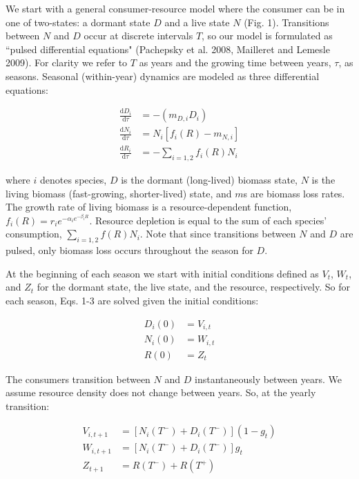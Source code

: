 \documentclass[12pt,]{article}
\begin{document}
We start with a general consumer-resource model where the consumer can
be in one of two-states: a dormant state \(D\) and a live state \(N\)
(Fig. 1). Transitions between \(N\) and \(D\) occur at discrete
intervals \(T\), so our model is formulated as ``pulsed differential
equations" (Pachepsky et al. 2008, Mailleret and Lemesle 2009). For
clarity we refer to \(T\) as years and the growing time between years,
\(\tau\), as seasons. Seasonal (within-year) dynamics are modeled as
three differential equations:

\begin{align}
\frac{\text{d}D_{i}}{\text{d}\tau} &= -(m_{D,i}D_{i})\\
\frac{\text{d}N_{i}}{\text{d}\tau} &= N_{i}[f_{i}(R) - m_{N,i}]\\
\frac{\text{d}R_{i}}{\text{d}\tau} &= - \sum\limits_{i=1,2}f_{i}(R)N_{i}
\end{align}

where \(i\) denotes species, \(D\) is the dormant (long-lived) biomass
state, \(N\) is the living biomass (fast-growing, shorter-lived) state,
and \(m\)s are biomass loss rates. The growth rate of living biomass is
a resource-dependent function,
\(f_{i}(R) = r_{i}e^{-\alpha_{i}e^{-\beta_{i}R}}\). Resource depletion
is equal to the sum of each species' consumption,
\(\sum_{i=1,2}f(R)N_{i}\). Note that since transitions between \(N\) and
\(D\) are pulsed, only biomass loss occurs throughout the season for
\(D\).

At the beginning of each season we start with initial conditions defined
as \(V_{t}\), \(W_{t}\), and \(Z_{t}\) for the dormant state, the live
state, and the resource, respectively. So for each season, Eqs. 1-3 are
solved given the initial conditions:

\begin{align}
  D_{i}(0) &= V_{i,t} \\
  N_{i}(0) &= W_{i,t} \\
  R(0) &= Z_{t}
\end{align}

The consumers transition between \(N\) and \(D\) instantaneously between
years. We assume resource density does not change between years. So, at
the yearly transition:

\begin{align}
  V_{i,t+1} &= [N_{i}(T^-)+D_{i}(T^-)](1-g_{t}) \\
  W_{i,t+1} &= [N_{i}(T^-)+D_{i}(T^-)]g_{t} \\
  Z_{t+1} &= R(T^-) + R(T^+)
\end{align}
\end{document}
